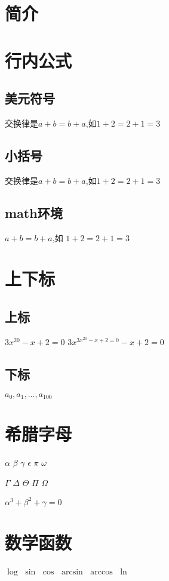 \documentclass{article}
\begin{document}
    \section{简介}
    \section{行内公式}
    \subsection{美元符号}
    交换律是$a+b=b+a$,如$1+2=2+1=3$
    \subsection{小括号}
    交换律是\(a+b=b+a\),如\(1+2=2+1=3\)
    \subsection{math环境}
    \begin{math}
        a+b=b+a
    \end{math},如
    \begin{math}
        1+2=2+1=3
    \end{math}
    \section{上下标}
    \subsection{上标}
    $3x^{20} - x + 2 =0$
    $3x^{3x^{20} - x + 2 =0} - x + 2 =0$
    \subsection{下标}
    $a_0,a_1,...,a_{100}$
    \section{希腊字母}
    $\alpha$
    $\beta$
    $\gamma$
    $\epsilon$
    $\pi$
    $\omega$

    $\Gamma$
    $\Delta$
    $\Theta$
    $\Pi$
    $\Omega$

    $\alpha^3 + \beta^2 + \gamma = 0 $



    \section{数学函数}
    $\log$
    $\sin$
    $\cos$
    $\arcsin$
    $\arccos$
    $\ln$
\end{document}
